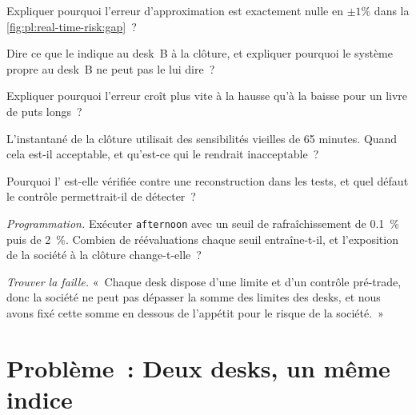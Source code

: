 \begin{exercise}[$\star$]\label{exo:pl:real-time-risk:2}
Expliquer pourquoi l'erreur d'approximation est exactement nulle en $\pm 1\%$ dans la \cref{fig:pl:real-time-risk:gap}~?
\end{exercise}

\begin{exercise}[$\star$]\label{exo:pl:real-time-risk:3}
Dire ce que le  indique au desk~B à la clôture, et expliquer pourquoi le système propre au desk~B ne peut pas le lui dire~?
\end{exercise}

\begin{exercise}[$\star\star$]\label{exo:pl:real-time-risk:4}
Expliquer pourquoi l'erreur croît plus vite à la hausse qu'à la baisse pour un livre de puts longs~?
\end{exercise}

\begin{exercise}[$\star\star$]\label{exo:pl:real-time-risk:5}
L'instantané de la clôture utilisait des sensibilités vieilles de 65 minutes. Quand cela est-il acceptable, et qu'est-ce qui le rendrait inacceptable~?
\end{exercise}

\begin{exercise}[$\star\star$]\label{exo:pl:real-time-risk:6}
Pourquoi l' est-elle vérifiée contre une reconstruction dans les tests, et quel défaut le contrôle permettrait-il de détecter~?
\end{exercise}

\begin{exercise}[$\star\star\star$]\label{exo:pl:real-time-risk:7}
\emph{Programmation.} Exécuter \texttt{afternoon} avec un seuil de rafraîchissement de 0.1~\% puis de 2~\%. Combien de
réévaluations chaque seuil entraîne-t-il, et l'exposition de la société à la clôture change-t-elle~?
\end{exercise}

\begin{exercise}[$\star\star\star$]\label{exo:pl:real-time-risk:8}
\emph{Trouver la faille.} «~Chaque desk dispose d'une limite et d'un contrôle pré-trade, donc la société ne peut pas dépasser la somme des limites des desks, et nous avons fixé
cette somme en dessous de l'appétit pour le risque de la société.~»
\end{exercise}

\section{Problème~: Deux desks, un même indice}

